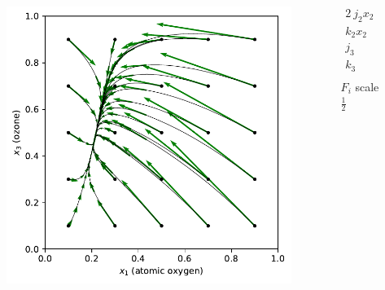 \begin{columns}
\begin{column}{0.65\textwidth}
\vspace{-0.35in}
\begin{figure}
\includegraphics[scale=0.65]{../Plots/chapman_1935.pdf}
\end{figure}
\end{column}
\begin{column}{0.35\textwidth}
\vspace{-0.35in}
\begin{align*}
2 \ j_2 x_2 &= 0.1 \\
k_2 x_2 &= 0.9 \\
j_3 &= 0.3 \\
k_3 &= 0.5 \\
\end{align*}
\hspace{0.4in} $F_i$ scale $\frac{1}{2}$
\end{column}
\end{columns}
